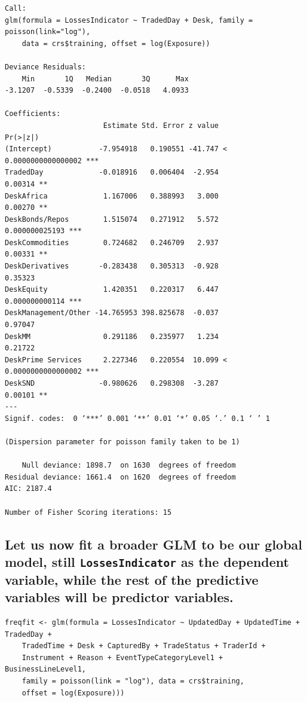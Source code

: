 \documentclass{DissertateUSU}
\begin{document}
\begin{verbatim}
Call:
glm(formula = LossesIndicator ~ TradedDay + Desk, family = poisson(link="log"), 
    data = crs$training, offset = log(Exposure))

Deviance Residuals: 
    Min       1Q   Median       3Q      Max  
-3.1207  -0.5339  -0.2400  -0.0518   4.0933  

Coefficients:
                       Estimate Std. Error z value             Pr(>|z|)    
(Intercept)           -7.954918   0.190551 -41.747 < 0.0000000000000002 ***
TradedDay             -0.018916   0.006404  -2.954              0.00314 ** 
DeskAfrica             1.167006   0.388993   3.000              0.00270 ** 
DeskBonds/Repos        1.515074   0.271912   5.572       0.000000025193 ***
DeskCommodities        0.724682   0.246709   2.937              0.00331 ** 
DeskDerivatives       -0.283438   0.305313  -0.928              0.35323    
DeskEquity             1.420351   0.220317   6.447       0.000000000114 ***
DeskManagement/Other -14.765953 398.825678  -0.037              0.97047    
DeskMM                 0.291186   0.235977   1.234              0.21722    
DeskPrime Services     2.227346   0.220554  10.099 < 0.0000000000000002 ***
DeskSND               -0.980626   0.298308  -3.287              0.00101 ** 
---
Signif. codes:  0 ‘***’ 0.001 ‘**’ 0.01 ‘*’ 0.05 ‘.’ 0.1 ‘ ’ 1

(Dispersion parameter for poisson family taken to be 1)

    Null deviance: 1898.7  on 1630  degrees of freedom
Residual deviance: 1661.4  on 1620  degrees of freedom
AIC: 2187.4

Number of Fisher Scoring iterations: 15
\end{verbatim}

\subsection{Let us now fit a broader GLM to be our global model, still \texttt{LossesIndicator} as the dependent variable, while the rest of the predictive variables will be predictor variables.}
\label{ssec:GLM estimation results}

\small

\begin{verbatim}
freqfit <- glm(formula = LossesIndicator ~ UpdatedDay + UpdatedTime + TradedDay + 
    TradedTime + Desk + CapturedBy + TradeStatus + TraderId + 
    Instrument + Reason + EventTypeCategoryLevel1 + BusinessLineLevel1, 
    family = poisson(link = "log"), data = crs$training, 
    offset = log(Exposure)))
\end{verbatim}
\end{document}
